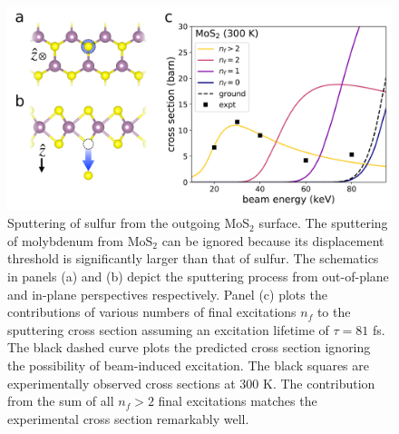 \documentclass{article}
\begin{document}
\begin{figure}
  \centering
  \includegraphics[width=.95\textwidth]{figures/MoS2Cross.pdf}
  \caption{
    Sputtering of sulfur from the outgoing MoS$_2$ surface.
    The sputtering of molybdenum from MoS$_2$ can be ignored because its
    displacement threshold is significantly larger than that of sulfur.
    The schematics in panels (a) and (b) depict the sputtering process from
    out-of-plane and in-plane perspectives respectively.
    Panel (c) plots the contributions of various numbers of final excitations
    $n_f$ to the sputtering cross section assuming an excitation lifetime of
    $\tau=81$ fs.
    The black dashed curve plots the predicted cross section ignoring the
    possibility of beam-induced excitation.
    The black squares are experimentally observed cross sections at 300 K.
    \cite{Kretschmer2020}
    The contribution from the sum of all $n_f>2$ final excitations matches
    the experimental cross section remarkably well.
  }
  \label{fig:MoS2Cross}
\end{figure}
\end{document}
